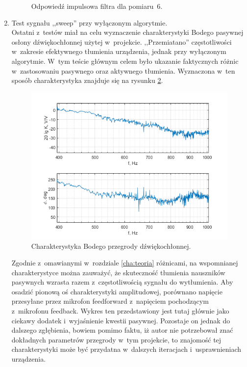 \begin{enumerate}
\begin{figure}[h!]
		\caption{Odpowiedź impulsowa filtra dla pomiaru~6.}
		\label{fig:test_6_lms}
\end{figure}
	\item Test sygnału ,,sweep'' przy wyłączonym algorytmie.\\
	Ostatni z~testów miał na celu wyznaczenie charakterystyki Bodego pasywnej osłony dźwiękochłonnej użytej w~projekcie. ,,Przemiatano'' częstotliwości w~zakresie efektywnego tłumienia urządzenia, jednak przy wyłączonym algorytmie. W~tym teście głównym celem było ukazanie faktycznych różnic w~zastosowaniu pasywnego oraz aktywnego tłumienia. Wyznaczona w~ten sposób charakterystyka znajduje się na rysunku \ref{fig:bode}.
	\begin{figure}[h!]
		\centering
		\includegraphics[scale=0.9]{../Assets/bode_przegrode.png}
		\caption{Charakterystyka Bodego przegrody dźwiękochłonnej.}
		\label{fig:bode}
	\end{figure}

Zgodnie z~omawianymi w~rozdziale \ref{cha:teoria} różnicami, na wspomnianej charakterystyce można zauważyć, że skuteczność tłumienia nauszników pasywnych wzrasta razem z~częstotliwością sygnału do wytłumienia. Aby osadzić pionową oś charakterystyki amplitudowej, porównano napięcie przesyłane przez mikrofon feedforward z~napięciem pochodzącym z~mikrofonu feedback. Wykres ten przedstawiony jest tutaj głównie jako ciekawy dodatek i~wyjaśnienie kwestii pasywnej. Pozostaje on jednak do dalszego zgłębienia, bowiem pomimo faktu, iż autor nie potrzebował znać dokładnych parametrów przegrody w~tym projekcie, to znajomość tej charakterystyki może być przydatna w~dalszych iteracjach i~usprawnieniach urządzenia.
\end{enumerate}